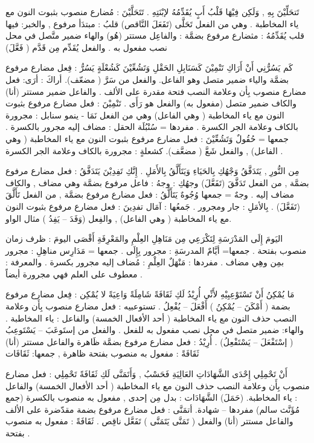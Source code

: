 \documentclass[a4paper]{article}
\begin{document}
\begin{flushright}
تَتحَلِّيْنَ بِهِ , وَلَكِن فِيْهَا قَلْبُ أَبٍ يُقَدِّمُهُ لإبْنَتِهِ .
تَتَحَلَّيْنَ : مُضارع منصوب بثبوت النون مع ياء المخاطبة .
            وهي من الفعل تَحَلَّى (تَفَعَلَ النَّاقص)
قلبُ : مبتدَأ مرفوع , والخبر: فيها قلب
يُقَدِّمُهُ : مثضارع مرفوع بضمَّة : والفاعِل مستتر (هُو) والهاء
      ضمير متَّصل في محل نصب مفعول به . والفعل يُقَدِّم  
      مِن قَدَّم ( فَعَّلَ)
 

كَم يَسُرُّنِي أَنْ أَرَاكِ تَنْمِيْنَ كَسَنَابِلِ الحَقْلِ وَتَشُعِّيْنَ كَشُعْلَةٍ
يَسُرُّ : فِعل مضارع مرفوع بضمَّة والياء ضمير متصل وهو الفاعل.
      والفعل من سَرَّ ( مضعّف).
أراكَ : أرَى: فعل مضارع منصوب بِأن وعلامة النصب فتحة مقدرة على
الألف . والفاعل ضمير مستتر (أنا) والكاف ضمير متصل (مفعول به) والفعل هو رَأَى .
تَنْمِيْنَ : فعل مضارع مرفوع بثبوت النون مع ياء المخاطبة ( وهي الفاعل)
      وهي من الفعل نَمَا - ينمو
سنابل : مجرورة بالكاف وعلامة الجر الكسرة . مفردها = سُنْبُلَة
الحقل : مضاف إليه مجرور بالكسرة . جمعها = حُقُولٌ
وَتَشُعِّيْنَ : فعل مضارع مرفوع بثبوت النون مع ياء المخاطبة ( وهي الفاعل) , والفعل شَعَّ ( مضعَّف).
كشعلةٍ : مجرورة بالكاف وعلامة الجر الكسرة .
 
مِن النُّورِ , يَتَدَفَّقُ وَجْهُكِ بِالحَيَاءِ وَيَتَأَلَّقُ بِالأَمَلِ . إِنَّكِ تَفِدِيْنَ
يَتَدَفَّقُ : فعل مضارع مرفوع بضمَّة , من الفعل تَدَفَّقَ (تَفَعَّلَ)
وجهُكِ : وجهُ : فاعل مرفوع بضمَّة وهي مضاف , والكاف مضاف إليه .
            وجهٌ = جمعها وُجُوهٌ
يَتَأَلَّقُ : فعل مضارع مرفوع بضمَّة , من الفعل تَأَلَّقَ (تَفَعَّلَ) .
بِالأمَلِ : جار ومجرور .  جَمعُها : آمَال
تفدِينَ : فعل مضارع مرفوع بثبوت النون مع ياء المخاطبة ( وهي الفاعل) , والفِعل (وَفَدَ – يَفِدُ ) مثال الواو.
 
اليَومَ إِلَى المَدْرَسَةِ لِتَكْرَعِي مِن مَنَاهِلِ العِلْمِ والمَعْرِفَةِ أَقْصَى
اليومَ : ظرف زمان منصوب بفتحة . جمعها= أيَّامٌ
المدرسَةِ : مجرور بِإِلَى . جمعها = مَدَارِس
مناهِلِ : مجرور بمِن وهِي مضاف . مفردها : مَنْهَلٌ
العِلْمِ : مُضاف إليه مجرور بكسرة .
والمعرفة : معطوف على العلم فهي مجرورة أيضاً .
 
مَا يُمْكِنُ أَنْ تَسْتَوْعِبِيْهِ لأَنِّي أُرِيْدُ لَكِ ثَقَافَةً شَامِلَةً وَاعِيَةً لا
يُمْكِن : فِعل مضارع مرفوع بضمة ( أَمْكَنَ – يُمْكِنُ ) أَفْعَلَ – يُفْعِلُ .
تستوعبيه : فعل مضارع منصوب بِأَن وعلامة النصب حذف النون مع ياء
      المخاطبة ( أحد الأفعال الخمسة) والفاعل : ياء المخاطبة . والهاء:
      ضمير متصل في محل نصب مفعول به للفعل . والفعل من
      إستَوعَبَ – يَسْتَوعِبُ ( إسْتَفْعَلَ – يَسْتَفْعِلُ) .
أُرِيْدُ : فعل مضارع مرفوع بضمَّة ظَاهرة والفاعل مستتر (أنا)
ثَقَافَةً : مفعول به منصوب بفتحة ظاهرة , جمعها: ثَقَافَات
 
أَنْ تَحْمِلِي إِحْدَى الشَّهَادَاتِ العَالِيَةِ فَحَسْبُ , وَأَتَمَنَّى لَكِ ثَقَافَةً
تَحْمِلِي : فعل مضارع منصوب بِأَن وعلامة النصب حذف النون مع ياء
      المخاطبة ( أحد الأفعال الخمسة) والفاعل : ياء المخاطبة. (حَمَلَ)
الشَّهَادَات : بدل مِن إحدى , مفعول به منصوب بالكسرة (جمع مُؤَنَّث سالم)
           مفردها – شهادة.
أتمَنَّى : فعل مضارع مرفوع بضمة مقدّضرة على الألف والفاعل مستتر   
      (أنا) والفعل ( تَمَنَّى يَتَمَنَّى ) تَفَعَّل ناقِص .
ثَقَافَةً : مفعول به منصوب بفتحة .
 

\end{flushright}
\end{document}
